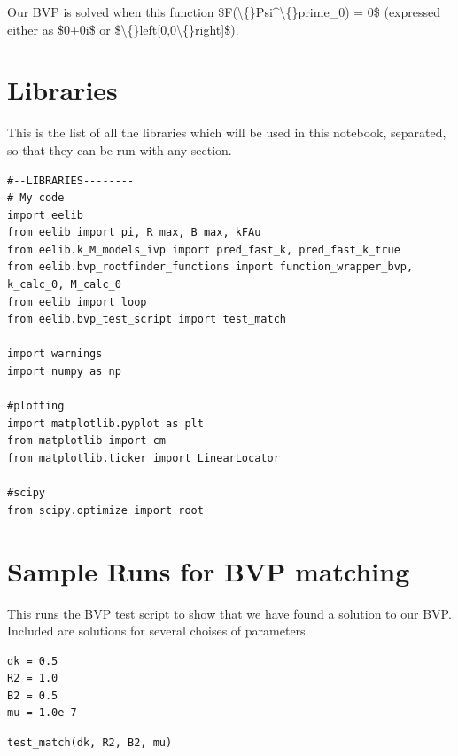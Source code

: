 \documentclass{article}
\begin{document}
Our BVP is solved when this function \$F(\textbackslash\{\}Psi\textasciicircum{}\textbackslash\{\}prime\_0) = 0\$ (expressed either as \$0+0i\$ or \$\textbackslash\{\}left[0,0\textbackslash\{\}right]\$).

\section{Libraries}

This is the list of all the libraries which will be used in this notebook, separated, so that they can be run with any section.

\begin{lstlisting}
#--LIBRARIES--------
# My code
import eelib
from eelib import pi, R_max, B_max, kFAu
from eelib.k_M_models_ivp import pred_fast_k, pred_fast_k_true
from eelib.bvp_rootfinder_functions import function_wrapper_bvp, k_calc_0, M_calc_0
from eelib import loop
from eelib.bvp_test_script import test_match

import warnings
import numpy as np

#plotting
import matplotlib.pyplot as plt
from matplotlib import cm
from matplotlib.ticker import LinearLocator

#scipy
from scipy.optimize import root\end{lstlisting}

\section{Sample Runs for BVP matching}

This runs the BVP test script to show that we have found a solution to our BVP. Included are solutions for several choises of parameters.

\begin{lstlisting}
dk = 0.5
R2 = 1.0
B2 = 0.5
mu = 1.0e-7\end{lstlisting}

\begin{lstlisting}
test_match(dk, R2, B2, mu)\end{lstlisting}
\end{document}
